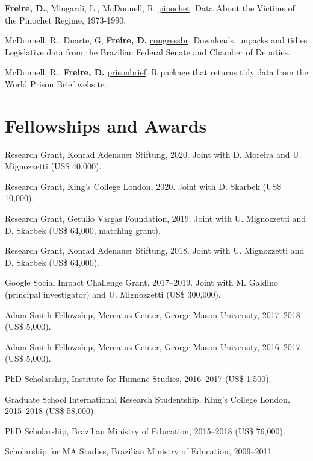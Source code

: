 \documentclass[a4paper]{article}
\renewenvironment{itemize}{
	\begin{list}{}{
			\setlength{\leftmargin}{1.5em}
		}
		}{
	\end{list}
}
\begin{document}
\begin{itemize}
\item \textbf{Freire, D.}, Mingardi, L., McDonnell, R. \href{http://danilofreire.github.io/pinochet}{pinochet}. Data About the Victims of the Pinochet Regime, 1973-1990.
\item McDonnell, R., Duarte, G, \textbf{Freire, D.} \href{https://github.com/RobertMyles/congressbr}{congressbr}. Downloads, unpacks and tidies Legislative data from the Brazilian Federal Senate and Chamber of Deputies.
\item McDonnell, R., \textbf{Freire, D.} \href{http://danilofreire.github.io/prisonbrief}{prisonbrief}. R package that returns tidy data from the World Prison Brief website.
\end{itemize}

\section*{Fellowships and Awards}

\begin{itemize}
\item Research Grant, Konrad Adenauer Stiftung, 2020. Joint with D. Moreira and U. Mignozzetti (US\$ 40,000).
\item Research Grant, King's College London, 2020. Joint with D. Skarbek (US\$ 10,000).
\item Research Grant, Getulio Vargas Foundation, 2019. Joint with U. Mignozzetti and D. Skarbek (US\$ 64,000, matching grant).
\item Research Grant, Konrad Adenauer Stiftung, 2018. Joint with U. Mignozzetti and D. Skarbek (US\$ 64,000).
\item Google Social Impact Challenge Grant, 2017--2019. Joint with M. Galdino (principal investigator) and U. Mignozzetti (US\$ 300,000).
\item Adam Smith Fellowship, Mercatus Center, George Mason University, 2017--2018 (US\$ 5,000).
\item Adam Smith Fellowship, Mercatus Center, George Mason University, 2016--2017 (US\$ 5,000).
\item PhD Scholarship, Institute for Humane Studies, 2016--2017 (US\$ 1,500).
\item Graduate School International Research Studentship, King's College London, 2015--2018 (US\$ 58,000).
\item PhD Scholarship, Brazilian Ministry of Education, 2015--2018 (US\$ 76,000).
\item Scholarship for MA Studies, Brazilian Ministry of Education, 2009--2011.
\end{itemize}
\end{document}
